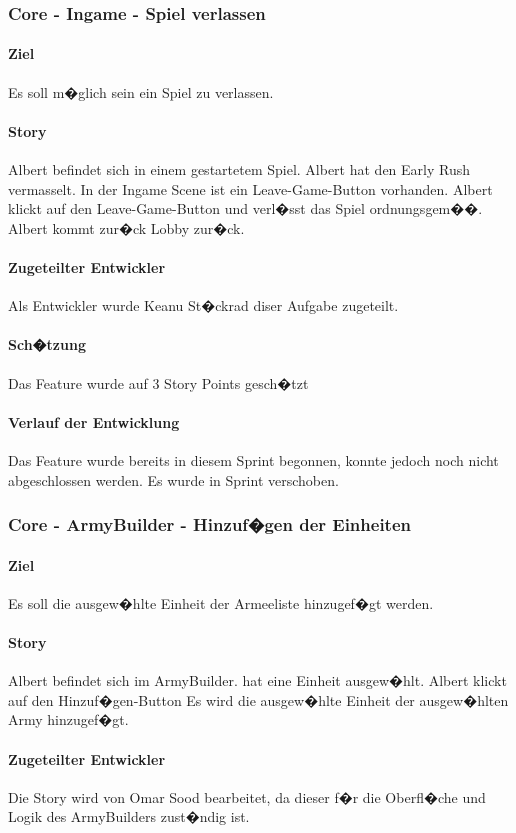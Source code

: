 \documentclass[12pt, titlepage]{scrartcl}
\newcommand{\RN}[1]{%
	\textup{\uppercase\expandafter{\romannumeral#1}}%
}
\begin{document}
		\subsubsection{Core - Ingame - Spiel verlassen}
		\paragraph{Ziel} Es soll m�glich sein ein Spiel zu verlassen.
		\paragraph{Story} Albert befindet sich in einem gestartetem Spiel. Albert hat den Early Rush vermasselt. In der Ingame Scene ist ein Leave-Game-Button vorhanden. Albert klickt auf den Leave-Game-Button und verl�sst das Spiel ordnungsgem��. Albert kommt zur�ck Lobby zur�ck.
		\paragraph{Zugeteilter Entwickler} Als Entwickler wurde Keanu St�ckrad diser Aufgabe zugeteilt.
		\paragraph{Sch�tzung}
		Das Feature wurde auf 3 Story Points gesch�tzt
		\paragraph{Verlauf der Entwicklung} 
		Das Feature wurde bereits in diesem Sprint begonnen, konnte jedoch noch nicht abgeschlossen werden. Es wurde in Sprint \RN{4} verschoben.
		
		\subsubsection{Core - ArmyBuilder - Hinzuf�gen der Einheiten}
		\paragraph{Ziel} Es soll die ausgew�hlte Einheit der Armeeliste hinzugef�gt werden.
		\paragraph{Story} Albert befindet sich im ArmyBuilder. hat eine Einheit ausgew�hlt. Albert klickt auf den  \glqq Hinzuf�gen\grqq-Button Es wird die ausgew�hlte Einheit der ausgew�hlten Army hinzugef�gt.
		\paragraph{Zugeteilter Entwickler} Die Story wird von Omar Sood bearbeitet, da dieser f�r die Oberfl�che und Logik des ArmyBuilders zust�ndig ist.
\end{document}
